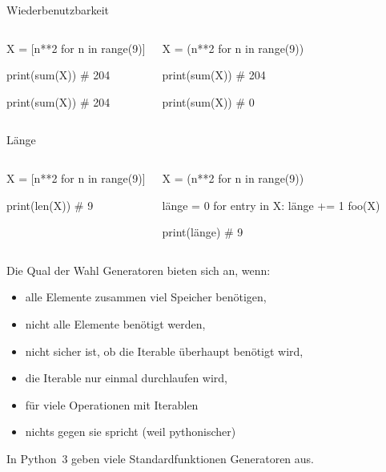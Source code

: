 \documentclass[xcolor=dvipsnames, aspectratio=169, 14pt]{beamer}
\begin{document}

\begin{frame}[fragile]{Wiederbenutzbarkeit}
	\begin{columns}%
	\begin{python3code}
	X = [n**2 for n in range(9)]
	
	print(sum(X))
	# 204
	
	print(sum(X))
	# 204
	\end{python3code}
	
	\begin{python3code}
	X = (n**2 for n in range(9))
	
	print(sum(X))
	# 204
	
	print(sum(X))
	# 0
	\end{python3code}
	\end{columns}
\end{frame}

\begin{frame}[fragile]{Länge}
	\begin{columns}%
	\column[t]{0.5\linewidth}
	\vspace{-\baselineskip}
	\begin{python3code}
	X = [n**2 for n in range(9)]
	
	print(len(X))
	# 9
	\end{python3code}
	
	\column[t]{0.5\linewidth}
	\vspace{-\baselineskip}
	\begin{python3code}
	X = (n**2 for n in range(9))

	länge = 0
	for entry in X:
		länge += 1
		foo(X)

	print(länge)
	# 9
	\end{python3code}
	\end{columns}
\end{frame}

\begin{frame}{Die Qual der Wahl}
	Generatoren bieten sich an, wenn:
	\vfill
	\begin{itemize}
		\setlength{\itemsep}{\fill}
		\item alle Elemente zusammen viel Speicher benötigen,
		\item nicht alle Elemente benötigt werden,
		\item nicht sicher ist, ob die Iterable überhaupt benötigt wird,
		\item die Iterable nur einmal durchlaufen wird,
		\item für viele Operationen mit Iterablen
		\item nichts gegen sie spricht (weil pythonischer)
	\end{itemize}
	\vfill
	In Python~3 geben viele Standardfunktionen Generatoren aus.
\end{frame}
\end{document}
